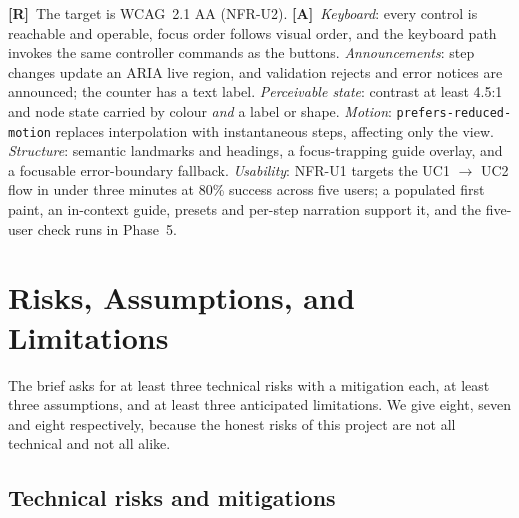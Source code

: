 \documentclass[11pt,a4paper]{article}
\newcommand{\R}{\textcolor{reqc}{\textbf{[R]}}}     %
\newcommand{\A}{\textcolor{asmc}{\textbf{[A]}}}     %
\newcommand{\ct}[1]{\texttt{#1}}
\begin{document}
\R\ The target is WCAG~2.1 AA (NFR-U2). \A\ \emph{Keyboard}: every control is reachable and
operable, focus order follows visual order, and the keyboard path invokes the same controller
commands as the buttons. \emph{Announcements}: step changes update an ARIA live region, and
validation rejects and error notices are announced; the counter has a text label.
\emph{Perceivable state}: contrast at least 4.5:1 and node state carried by colour \emph{and} a
label or shape. \emph{Motion}: \ct{prefers-reduced-motion} replaces interpolation with
instantaneous steps, affecting only the view. \emph{Structure}: semantic landmarks and headings,
a focus-trapping guide overlay, and a focusable error-boundary fallback. \emph{Usability}:
NFR-U1 targets the UC1 $\to$ UC2 flow in under three minutes at 80\% success across five users;
a populated first paint, an in-context guide, presets and per-step narration support it, and
the five-user check runs in Phase~5.

\section{Risks, Assumptions, and Limitations}

The brief asks for at least three technical risks with a mitigation each, at least three
assumptions, and at least three anticipated limitations. We give eight, seven and eight
respectively, because the honest risks of this project are not all technical and not all
alike.

\subsection{Technical risks and mitigations}
\end{document}
